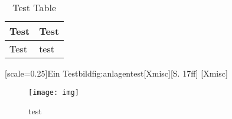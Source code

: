 \begin{table}[H]
    \caption{Test Table}
    \begin{tabular}{| l | l |}
        Test & Test\\
        \hline Test & test
    \end{tabular}
\end{table}

[scale=0.25]{Ein Testbild}{fig:anlagentest}[Xmisc][S. 17ff]
[Xmisc]

\begin{figure}[H]
    \centering
    \caption{test}
    \texttt{[image: img]}
    \label{fig:anlagentest2}
\end{figure}
